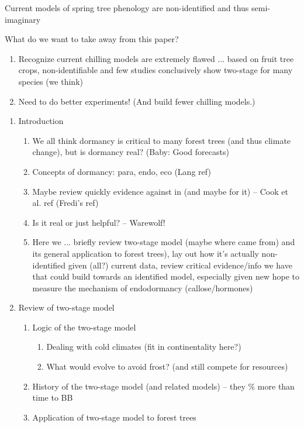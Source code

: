 \documentclass[11pt,letter]{article}
\begin{document}
Current models of spring tree phenology are non-identified and thus semi-imaginary

What do we want to take away from this paper?
\begin{enumerate}
\item Recognize current chilling models are extremely flawed ... based on fruit tree crops, non-identifiable and few studies conclusively show two-stage for many species (we think) 
\item Need to do better experiments! (And build fewer chilling models.)
\end{enumerate}

\begin{enumerate}
\item Introduction
\begin{enumerate}
\item We all think dormancy is critical to many forest trees (and thus climate change), but is dormancy real? (Baby: Good forecasts)
\item Concepts of dormancy: para, endo, eco (Lang ref)
\item Maybe review quickly evidence against in (and maybe for it) -- Cook et al. ref (Fredi's ref)
\item Is it real or just helpful? -- Warewolf!
\item Here we ... briefly review two-stage model  (maybe where came from) and its general application to forest trees), lay out how it's actually non-identified given (all?) current data, review critical evidence/info we have that could build towards an identified model, especially given new hope to measure the mechanism of endodormancy (callose/hormones)
\end{enumerate}
\item Review of two-stage model
\begin{enumerate}
\item Logic of the two-stage model
\begin{enumerate}
\item Dealing with cold climates (fit in continentality here?)
\item What would evolve to avoid frost? (and still compete for resources)
\end{enumerate}
\item History of the two-stage model (and related models) --  they \% more than time to BB
\item Application of two-stage model to forest trees
\begin{enumerate}

\end{enumerate}
\end{enumerate}
\end{enumerate}
\end{document}
